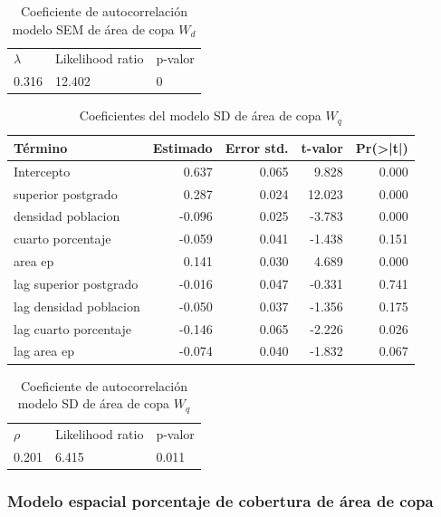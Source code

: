 \documentclass[12pt,a4paper,openany]{book}
\theoremstyle{definition}
\theoremstyle{definition}
\theoremstyle{definition}
\theoremstyle{remark}
\begin{document}
\begin{table}[t]

\caption{\label{tab:cauto-sem-copa}Coeficiente de autocorrelación modelo SEM de área de copa $W_d$}
\centering
\begin{tabular}{lll}
\toprule
$\lambda$ & Likelihood ratio & p-valor\\
0.316 & 12.402 & 0\\
\bottomrule
\end{tabular}
\end{table}

\begin{table}[t]

\caption{\label{tab:coef-sd-copa-wq}Coeficientes del modelo SD de área de copa $W_q$}
\centering
\begin{tabular}{lrrrr}
\toprule
Término & Estimado & Error std. & t-valor & Pr(>|t|)\\
\midrule
Intercepto & 0.637 & 0.065 & 9.828 & 0.000\\
superior postgrado & 0.287 & 0.024 & 12.023 & 0.000\\
densidad poblacion & -0.096 & 0.025 & -3.783 & 0.000\\
cuarto porcentaje & -0.059 & 0.041 & -1.438 & 0.151\\
area ep & 0.141 & 0.030 & 4.689 & 0.000\\
\addlinespace
lag superior postgrado & -0.016 & 0.047 & -0.331 & 0.741\\
lag densidad poblacion & -0.050 & 0.037 & -1.356 & 0.175\\
lag cuarto porcentaje & -0.146 & 0.065 & -2.226 & 0.026\\
lag area ep & -0.074 & 0.040 & -1.832 & 0.067\\
\bottomrule
\end{tabular}
\end{table}

\begin{table}[t]

\caption{\label{tab:cauto-sd-copa-wq}Coeficiente de autocorrelación modelo SD de área de copa $W_q$}
\centering
\begin{tabular}{lll}
\toprule
$\rho$ & Likelihood ratio & p-valor\\
0.201 & 6.415 & 0.011\\
\bottomrule
\end{tabular}
\end{table}

\subsubsection{Modelo espacial porcentaje de cobertura de área de
copa}\label{modelo-espacial-porcentaje-de-cobertura-de-area-de-copa}
\end{document}
